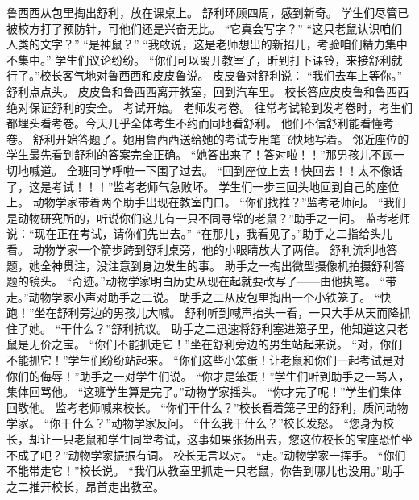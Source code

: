 \documentclass[a4paper,12pt,UTF8,twoside]{ctexbook}
\begin{document}
        鲁西西从包里掏出舒利，放在课桌上。 
        舒利环顾四周，感到新奇。 
        学生们尽管已被校方打了预防针，可他们还是兴奋无比。 
        “它真会写字？” 
        “这只老鼠认识咱们人类的文字？” 
        “是神鼠？” 
        “我敢说，这是老师想出的新招儿，考验咱们精力集中不集中。” 
        学生们议论纷纷。 
        “你们可以离开教室了，昕到打下课铃，来接舒利就行了。”校长客气地对鲁西西和皮皮鲁说。 
        皮皮鲁对舒利说：  “我们去车上等你。” 
        舒利点点头。 
        皮皮鲁和鲁西西离开教室，回到汽车里。 
        校长答应皮皮鲁和鲁西西绝对保证舒利的安全。 
        考试开始。 
        老师发考卷。 
        往常考试轮到发考卷时，考生们都埋头看考卷。今天几乎全体考生不约而同地看舒利。 
        他们不信舒利能看懂考卷。 
        舒利开始答题了。她用鲁西西送给她的考试专用笔飞快地写着。 
        邻近座位的学生最先看到舒利的答案完全正确。 
        “她答出来了！答对啦！！”那男孩儿不顾一切地喊道。 
        全班同学呼啦一下围了过去。 
        “回到座位上去！快回去！！太不像话了，这是考试！！！”监考老师气急败坏。 
        学生们一步三回头地回到自己的座位上。 
        动物学家带着两个助手出现在教室门口。 
        “你们找推？”监考老师问。 
        “我们是动物研究所的，听说你们这儿有一只不同寻常的老鼠？”助手之一问。 
        监考老师说：“现在正在考试，请你们先出去。” 
        “在那儿，我看见了。”助手之二指给头儿看。 
        动物学家一个箭步跨到舒利桌旁，他的小眼睛放大了两倍。 
        舒利流利地答题，她全神贯注，没注意到身边发生的事。 
        助手之一掏出微型摄像机拍摄舒利答题的镜头。 
        “奇迹。”动物学家明白历史从现在起就要改写了——由他执笔。 
        “带走。”动物学家小声对助手之二说。 
        助手之二从皮包里掏出一个小铁笼子。 
        “快跑！”坐在舒利旁边的男孩儿大喊。 
        舒利听到喊声抬头一看，一只大手从天而降抓住了她。 
        “干什么？”舒利抗议。 
        助手之二迅速将舒利塞进笼子里，他知道这只老鼠是无价之宝。 
        “你们不能抓走它！”坐在舒利旁边的男生站起来说。 
        “对，你们不能抓它！”学生们纷纷站起来。 
        “你们这些小笨蛋！让老鼠和你们一起考试是对你们的侮辱！”助手之一对学生们说。 
        “你才是笨蛋！”学生们听到助手之一骂人，集体回骂他。 
        “这班学生算是完了。”动物学家摇头。 
        “你才完了呢！”学生们集体回敬他。 
        监考老师喊来校长。 
        “你们干什么？”校长看着笼子里的舒利，质问动物学家。 
        “你干什么？”动物学家反问。 
        “什么我干什么？”校长发怒。 
        “您身为校长，却让一只老鼠和学生同堂考试，这事如果张扬出去，您这位校长的宝座恐怕坐不成了吧？”动物学家振振有词。 
        校长无言以对。 
        “走。”动物学家一挥手。 
        “你们不能带走它！”校长说。 
        “我们从教室里抓走一只老鼠，你告到哪儿也没用。”助手之二推开校长，昂首走出教室。 
\end{document}
